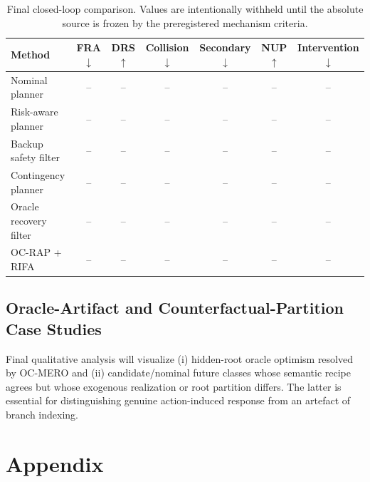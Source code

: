\documentclass[conference]{IEEEtran}
\begin{document}
\begin{table}[t]
\centering
\caption{Final closed-loop comparison. Values are intentionally withheld until the absolute source is frozen by the preregistered mechanism criteria.}
\label{tab:main_results}
\begin{tabular}{lcccccc}
\toprule
Method & FRA $\downarrow$ & DRS $\uparrow$ & Collision $\downarrow$ & Secondary $\downarrow$ & NUP $\uparrow$ & Intervention $\downarrow$ \\
\midrule
Nominal planner & -- & -- & -- & -- & -- & -- \\
Risk-aware planner & -- & -- & -- & -- & -- & -- \\
Backup safety filter & -- & -- & -- & -- & -- & -- \\
Contingency planner & -- & -- & -- & -- & -- & -- \\
Oracle recovery filter & -- & -- & -- & -- & -- & -- \\
OC-RAP + RIFA & -- & -- & -- & -- & -- & -- \\
\bottomrule
\end{tabular}
\end{table}

\subsection{Oracle-Artifact and Counterfactual-Partition Case Studies}
\label{subsec:case_study}
Final qualitative analysis will visualize (i) hidden-root oracle optimism resolved by OC-MERO and (ii) candidate/nominal future classes whose semantic recipe agrees but whose exogenous realization or root partition differs. The latter is essential for distinguishing genuine action-induced response from an artefact of branch indexing.

\appendix
\section{Appendix}
\label{sec:appendix}
\end{document}
